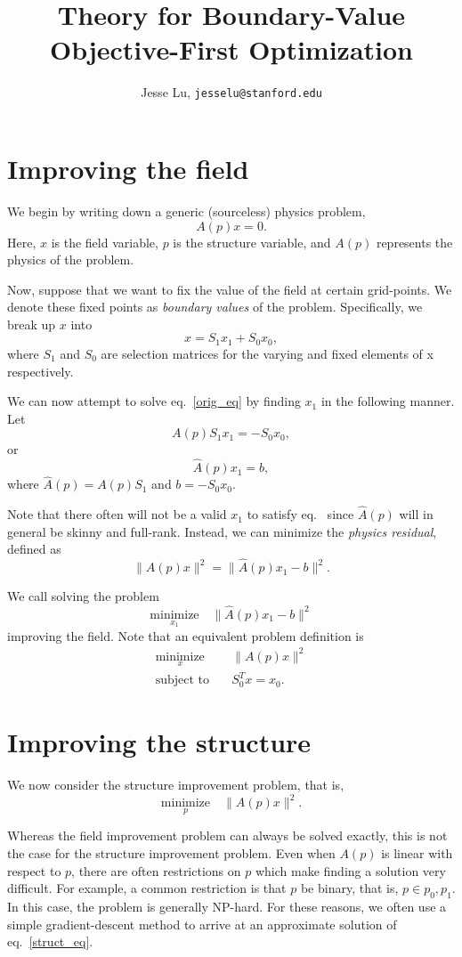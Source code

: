 \documentclass{article}
\title{Theory for Boundary-Value Objective-First Optimization}
\author{Jesse Lu, \texttt{jesselu@stanford.edu}}
\newcommand{\be}{\begin{equation}}
\newcommand{\ee}{\end{equation}}
\newcommand{\MIN}[1]{\underset{#1}{\text{minimize}}\quad}
\newcommand{\ST}{\text{subject to}\quad}
\begin{document}
\maketitle
\tableofcontents

\section{Improving the field}
We begin by writing down a generic (sourceless) physics problem, 
\be A(p)x = 0. \label{orig_eq} \ee
Here, $x$ is the field variable, $p$ is the structure variable, and $A(p)$ represents the physics of the problem.

Now, suppose that we want to fix the value of the field at certain grid-points. 
We denote these fixed points as \emph{boundary values} of the problem.
Specifically, we break up $x$ into
\be x = S_1 x_1 + S_0 x_0, \ee
where $S_1$ and $S_0$ are selection matrices for the varying and fixed elements of x respectively. 

We can now attempt to solve eq.~\ref{orig_eq} by finding $x_1$ in the following manner. Let
\be A(p)S_1 x_1 = -S_0 x_0, \ee
or
\be \hat{A}(p) x_1 = b, \label{field_eq} \ee
where $\hat{A}(p) = A(p) S_1$ and $b = -S_0 x_0$.

Note that there often will not be a valid $x_1$ to satisfy eq.~\cite{field_eq} since $\hat{A}(p)$ will in general be skinny and full-rank. 
Instead, we can minimize the \emph{physics residual}, defined as
\be \| A(p)x \|^2 = \| \hat{A}(p) x_1 - b \|^2. \ee

We call solving the problem
\be \MIN{x_1} \| \hat{A}(p)x_1 - b \|^2\ee
improving the field.
Note that an equivalent problem definition is
\begin{align}
    \MIN{x}& \| A(p)x \|^2 \\
    \ST& S_0^T x = x_0.
\end{align}


\section{Improving the structure}
We now consider the structure improvement problem, that is,
\be \MIN{p} \| A(p)x \|^2. \label{struct_eq}\ee

Whereas the field improvement problem can always be solved exactly, this is not the case for the structure improvement problem. 
Even when $A(p)$ is linear with respect to $p$, there are often restrictions on $p$ which make finding a solution very difficult. 
For example, a common restriction is that $p$ be binary, that is, $p \in {p_0, p_1}$. 
In this case, the problem is generally NP-hard.
For these reasons, we often use a simple gradient-descent method to arrive at an approximate solution of eq.~\ref{struct_eq}.
\end{document}
